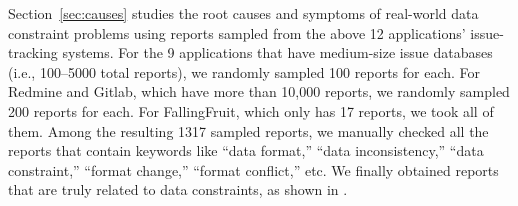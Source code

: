 Section~\ref{sec:causes} studies the root causes and symptoms of real-world data constraint problems using
\numissuescon reports sampled from the above 12 applications' issue-tracking systems. For the 9 applications that have medium-size
issue databases (i.e., 100--5000 total reports), we randomly sampled 100 reports for each. For Redmine and Gitlab, which have more than 10,000 reports, we randomly sampled 200 reports for each. For FallingFruit, which only has 17 reports, we took all of them. Among the resulting 1317 sampled reports, we manually
checked all the reports that contain keywords like ``data format,'' ``data inconsistency,'' ``data constraint,'' ``format change,'' ``format conflict,'' etc. We finally obtained
\numissuescon reports that are truly related to data constraints, as shown in .  